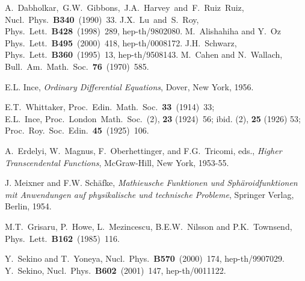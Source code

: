 \documentclass[a4paper,12pt]{article}
\begin{document}
\begin{thebibliography}{99}
A.~Dabholkar,~G.W.~Gibbons,~J.A.~Harvey~and~F.~Ruiz~Ruiz,~
Nucl.~Phys.~{\bf B340}~(1990)~33.
J.X.~Lu~and~S.~Roy,
Phys.~Lett.~{\bf B428}~(1998)~289, hep-th/9802080.
M.~Alishahiha and Y.~Oz
Phys.~Lett.~{\bf  B495}~(2000)~418, hep-th/0008172.
J.H.~Schwarz, 
Phys.~Lett.~{\bf B360}~(1995)~13, hep-th/9508143.
M.~Cahen and N.~Wallach, 
Bull.~Am.~Math.~Soc.~{\bf 76}~(1970)~585.



 E.L. Ince, {\it Ordinary Differential Equations},
Dover, New York, 1956.

E.T.~Whittaker, Proc.~Edin.~Math.~Soc.~{\bf 33}~(1914)~33;\\
E.L.~Ince, Proc.~London~Math.~Soc.~(2), {\bf 23} (1924)~56;
ibid. (2), {\bf 25} (1926) 53;
Proc.~Roy.~Soc.~Edin.~{\bf 45}~(1925)~106.

A.~Erdelyi, W.~Magnus, F.~Oberhettinger, and 
F.G.~Tricomi, eds., {\it Higher
  Transcendental Functions}, 
McGraw-Hill, New York, 1953-55.


 J. Meixner and F.W. Sch\"afke,
{\it Mathieusche Funktionen und Sph\"aroidfunktionen mit 
Anwendungen auf physikalische und technische Probleme},
Springer Verlag, Berlin, 1954.


M.T.~Grisaru, P.~Howe, L.~Mezincescu,
B.E.W.~Nilsson and P.K.~Townsend,
Phys.~Lett.~{\bf B162}~(1985)~116.

Y.~Sekino and T.~Yoneya,
Nucl.~Phys.~{\bf B570}~(2000)~174, hep-th/9907029.
 Y.~Sekino,
Nucl.~Phys.~{\bf B602}~(2001)~147, hep-th/0011122.



\end{thebibliography}
\end{document}
